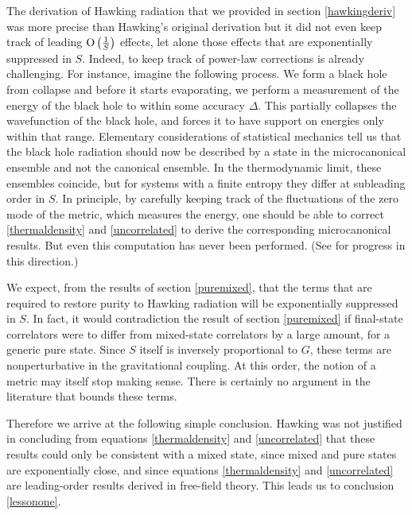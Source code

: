 \documentclass[12pt]{article}
\def\gnewt{G}
\def\Or[#1]{{\text{O}}\left({#1}\right)}
\begin{document}
The derivation of Hawking radiation that we provided in section \ref{hawkingderiv} was more precise than Hawking's original derivation but it did not even keep track of leading  $\Or[{1 \over S}]$ effects, let alone those effects that are exponentially suppressed in $S$. Indeed, to keep track of power-law corrections is already challenging. For instance, imagine the following process. We form a black hole from collapse and before it starts evaporating, we perform a measurement of the energy of the black hole to within some accuracy $\Delta$. This partially collapses the wavefunction of the black hole, and forces it to have support on energies only within that range. Elementary considerations of statistical mechanics tell us that the black hole radiation should now be described by a state in the microcanonical ensemble and not the canonical ensemble. In the thermodynamic limit, these ensembles coincide, but for systems with a finite
entropy they differ at subleading order in $S$. In principle, by carefully keeping track of the fluctuations of the zero mode of the metric, which measures the energy, one should be able to correct \eqref{thermaldensity} and \eqref{uncorrelated} to derive the corresponding microcanonical results. But even this computation has never been performed. (See \cite{Brustein:2013ena,Brustein:2013qma,Saini:2015dea} for progress in this direction.)

We expect, from the results of section \ref{puremixed}, that the terms that are required to restore purity to Hawking radiation will be exponentially suppressed in $S$. In fact, it would contradiction the result of section \ref{puremixed} if final-state correlators were to differ from mixed-state correlators by a large amount, for a generic pure state.  
Since $S$ itself is inversely proportional to $\gnewt$, these terms are nonperturbative in the gravitational coupling. At this order, the notion of a metric may itself stop making sense. There is certainly no argument in the literature that bounds these terms.


Therefore we arrive at the following simple conclusion. Hawking was not justified in concluding from equations \eqref{thermaldensity} and \eqref{uncorrelated} that these results could only be consistent with a mixed state, since mixed and pure states are exponentially close, and since equations \eqref{thermaldensity} and \eqref{uncorrelated} are leading-order results derived in free-field theory. This leads us to conclusion \ref{lessonone}. 
\end{document}
